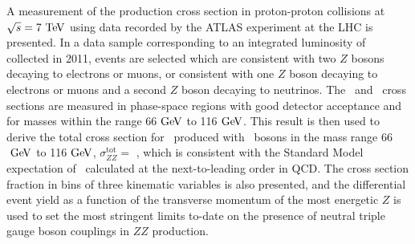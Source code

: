 A measurement of the \ZZ production cross section in proton-proton collisions
at $\sqrt{s} = 7\TeV$ using data recorded by the ATLAS experiment 
at the LHC is presented.  
In a data sample corresponding to an integrated luminosity of
\lumi collected in 2011, events are selected which are consistent with two $Z$ bosons
decaying to electrons or muons, or consistent with one $Z$ boson
decaying to electrons or muons and a second $Z$ boson decaying to
neutrinos.   The \zzllll\ and \zzllvv\ cross
sections are measured in phase-space regions with good detector acceptance
and for masses within the range 66$\GeV$ to 116$\GeV$.
This result is then used to derive the total cross section for \ZZ\
produced with \Z\ bosons in the mass range 66$\GeV$ to 116$\GeV$, $\sigma_{ZZ}^\mathrm{tot} = $ \totzz, which is consistent with the Standard Model
expectation of \theoryzzmass\ calculated at the next-to-leading order in QCD.
The cross section fraction in bins of three kinematic variables is also presented, and 
the differential event yield as a function of the transverse momentum of the most energetic $Z$ 
is used to set the most stringent limits to-date on the presence of 
neutral triple gauge boson couplings in $ZZ$ production.
